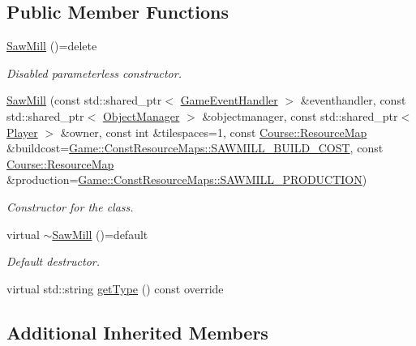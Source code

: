 \subsection*{Public Member Functions}
\begin{DoxyCompactItemize}
\item 
\hyperlink{classGame_1_1SawMill_a95000ee2a18a7c1bf3a34c84b1c2cf8d}{Saw\-Mill} ()=delete
\begin{DoxyCompactList}\small\item\em Disabled parameterless constructor. \end{DoxyCompactList}\item 
\hyperlink{classGame_1_1SawMill_a981300064bd66ef5e752a1d00e516bfc}{Saw\-Mill} (const std\-::shared\-\_\-ptr$<$ \hyperlink{classGame_1_1GameEventHandler}{Game\-Event\-Handler} $>$ \&eventhandler, const std\-::shared\-\_\-ptr$<$ \hyperlink{classGame_1_1ObjectManager}{Object\-Manager} $>$ \&objectmanager, const std\-::shared\-\_\-ptr$<$ \hyperlink{classGame_1_1Player}{Player} $>$ \&owner, const int \&tilespaces=1, const \hyperlink{namespaceCourse_ab9a46ed9cd00485e318e5731ea2f78d9}{Course\-::\-Resource\-Map} \&buildcost=\hyperlink{namespaceGame_1_1ConstResourceMaps_a8101879b3f9a231535e629475969da07}{Game\-::\-Const\-Resource\-Maps\-::\-S\-A\-W\-M\-I\-L\-L\-\_\-\-B\-U\-I\-L\-D\-\_\-\-C\-O\-S\-T}, const \hyperlink{namespaceCourse_ab9a46ed9cd00485e318e5731ea2f78d9}{Course\-::\-Resource\-Map} \&production=\hyperlink{namespaceGame_1_1ConstResourceMaps_a1302532b63eb3d623779fb539dd767e8}{Game\-::\-Const\-Resource\-Maps\-::\-S\-A\-W\-M\-I\-L\-L\-\_\-\-P\-R\-O\-D\-U\-C\-T\-I\-O\-N})
\begin{DoxyCompactList}\small\item\em Constructor for the class. \end{DoxyCompactList}\item 
virtual \hyperlink{classGame_1_1SawMill_a9755f338538ca6bfec391f538ee435d8}{$\sim$\-Saw\-Mill} ()=default
\begin{DoxyCompactList}\small\item\em Default destructor. \end{DoxyCompactList}\item 
virtual std\-::string \hyperlink{classGame_1_1SawMill_a1dd6fd6bce2044107b121f3bbf012691}{get\-Type} () const override
\end{DoxyCompactItemize}
\subsection*{Additional Inherited Members}



